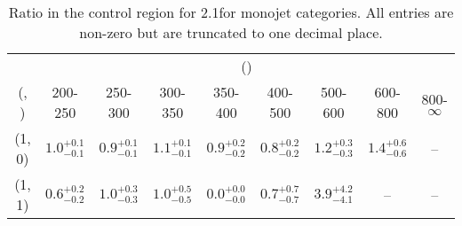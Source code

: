 \begin{table}[h!]
\tiny
\centering
\caption{Ratio in the \mmj control region for 2.1\ifb for monojet categories. All entries are non-zero but are truncated to one decimal place.\label{tab:ratiosepnaive_mumu_ewk_mono}}
\begin{tabular}
{ccccccccc}
	\hline\hline
	& \multicolumn{8}{c}{\scalht (\gev)} \\ 
	 (\njet,  \nb) & 200-250 & 250-300 & 300-350 & 350-400 & 400-500 & 500-600 & 600-800 & 800-$\infty$ \\ [0.8ex] 
\hline
	(1, 0) & $1.0^{+ 0.1 }_{- 0.1 }$ & $0.9^{+ 0.1 }_{- 0.1 }$ & $1.1^{+ 0.1 }_{- 0.1 }$ & $0.9^{+ 0.2 }_{- 0.2 }$ & $0.8^{+ 0.2 }_{- 0.2 }$ & $1.2^{+ 0.3 }_{- 0.3 }$ & $1.4^{+ 0.6 }_{- 0.6 }$ & -- \\[0.5ex] 
	(1, 1) & $0.6^{+ 0.2 }_{- 0.2 }$ & $1.0^{+ 0.3 }_{- 0.3 }$ & $1.0^{+ 0.5 }_{- 0.5 }$ & $0.0^{+ 0.0 }_{- 0.0 }$ & $0.7^{+ 0.7 }_{- 0.7 }$ & $3.9^{+ 4.2 }_{- 4.1 }$ & -- & -- \\[0.5ex] 
	\hline
	\hline
\end{tabular}
\end{table}
